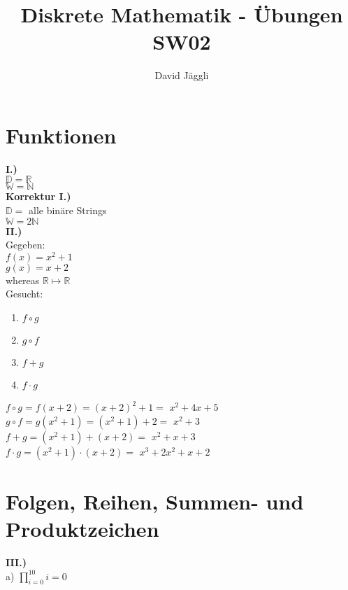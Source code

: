\documentclass[12pt]{scrartcl}
\author{David Jäggli}
\title{Diskrete Mathematik - Übungen SW02}
\begin{document}
\maketitle

\tableofcontents

\newpage
\section{Funktionen}
\textbf{I.)}\\
$\mathbb{D} = \mathbb{R}$\\
$\mathbb{W} = \mathbb{N}$\\

\textbf{Korrektur I.)}\\
$\mathbb{D} =$ alle binäre Strings\\
$\mathbb{W} = 2\mathbb{N}$\\


\textbf{II.)}\\
Gegeben:\\
$f(x) = x^2 + 1$\\
$g(x) = x + 2$\\
whereas $\mathbb{R} \mapsto \mathbb{R}$\\

Gesucht:
\begin{enumerate}
    \item $f \circ g$
    \item $g \circ f$
    \item $f + g$
    \item $f \cdot g$\\
\end{enumerate}

$f \circ g = f(x + 2) = (x + 2)^2 + 1 =$ \underline{$x^2 + 4x + 5$}\\
$g \circ f = g(x^2 + 1) = (x^2 + 1) + 2 =$ \underline{$x^2 + 3$}\\
$f + g = (x^2 + 1) + (x + 2) =$ \underline{$x^2 + x + 3$}\\
$f \cdot g = (x^2 + 1) \cdot (x + 2) =$ \underline{$x^3 + 2x^2 + x + 2$}\\


\newpage
\section{Folgen, Reihen, Summen- und Produktzeichen}
\textbf{III.)}\\
a)
$\displaystyle{\prod_{i=0}^{10} i} = 0$\\
\end{document}
